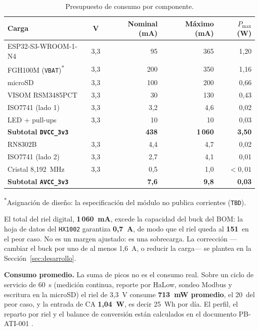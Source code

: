 \documentclass[11pt,a4paper]{article}
\newcommand{\pct}{\text{\char37}}
\begin{document}
\begin{table}[H]
\centering
\caption{Presupuesto de consumo por componente.}
\label{tab:presupuesto}
\small
\begin{tabularx}{\textwidth}{@{}X c r r r@{}}
\toprule
\textbf{Carga} & \textbf{V} & \textbf{Nominal (mA)} & \textbf{Máximo (mA)} & \textbf{$P_{\max}$ (W)} \\
\midrule
ESP32-S3-WROOM-1-N4 & 3,3 & 95 & 365 & 1,20 \\
FGH100M (\texttt{VBAT})\textsuperscript{*} & 3,3 & 200 & 350 & 1,16 \\
microSD & 3,3 & 100 & 200 & 0,66 \\
VISOM RSM3485PCT & 3,3 & 30 & 130 & 0,43 \\
ISO7741 (lado 1) & 3,3 & 3,2 & 4,6 & 0,02 \\
LED + pull-ups & 3,3 & 10 & 10 & 0,03 \\
\midrule
\textbf{Subtotal \texttt{DVCC\_3v3}} & & \textbf{438} & \textbf{1\,060} & \textbf{3,50} \\
\midrule
RN8302B & 3,3 & 4,4 & 4,7 & 0,02 \\
ISO7741 (lado 2) & 3,3 & 2,7 & 4,1 & 0,01 \\
Cristal 8,192~MHz & 3,3 & 0,5 & 1,0 & $<0{,}01$ \\
\midrule
\textbf{Subtotal \texttt{AVCC\_3v3}} & & \textbf{7,6} & \textbf{9,8} & \textbf{0,03} \\
\bottomrule
\end{tabularx}

\vspace{2pt}
{\footnotesize \textsuperscript{*}Asignación de diseño: la especificación del módulo no publica corrientes (\texttt{TBD}).}
\end{table}

\noindent El total del riel digital, \textbf{1\,060~mA}, excede la capacidad del
buck del BOM: la hoja de datos del \texttt{HX1002} garantiza \textbf{0,7~A}, de
modo que el riel queda al \textbf{151\,\pct} en el peor caso. No es un margen
ajustado: es una sobrecarga. La corrección ---cambiar el buck por uno de al menos
1,6~A, o reducir la carga--- se plantea en la Sección~\ref{sec:desarrollo}.

\noindent\textbf{Consumo promedio.} La suma de picos no es el consumo real. Sobre
un ciclo de servicio de 60~s (medición continua, reporte por HaLow, sondeo
Modbus y escritura en la microSD) el riel de 3,3~V consume \textbf{713~mW
promedio}, el 20\,\pct{} del peor caso, y la entrada de CA \textbf{1,04~W}, es
decir 25~Wh por día. El perfil, el reparto por riel y el balance de conversión
están calculados en el documento PB-ATI-001 \cite{pbati}.
\end{document}
